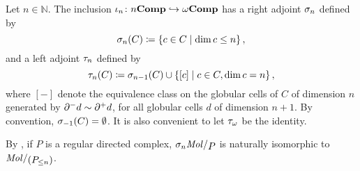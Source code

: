 \begin{dfn} 
    Let \( n \in \mathbb{N} \).
    The inclusion \( \iota_n \colon {n\mathbf{Comp}} \hookrightarrow \omega\mathbf{Comp} \) has a right adjoint \( \sigma_{n} \) defined by
    \begin{equation*}
        \sigma_{n}(C) \coloneqq \left\{ {c \in C \mid \dim c \le n} \right\},
    \end{equation*}
    and a left adjoint \( \tau_{n} \) defined by
    \begin{equation*}
        \tau_{n}(C) \coloneqq \sigma_{n - 1}(C) \cup \left\{ {[c] \mid c \in C, \dim c = n} \right\},
    \end{equation*}
    where \( [-] \) denote the equivalence class on the globular cells of \( C \) of dimension \( n \) generated by \( \partial_{}^{-} d \sim \partial_{}^{+} d \), for all globular cells \( d \) of dimension \( n + 1 \). 
    By convention, \( \sigma_{-1}(C) = \emptyset \).
    It is also convenient to let \( \tau_{\omega} \) be the identity.
\end{dfn}

\begin{rmk}
    By \cite[Proposition 5.2.14]{hadzihasanovic2024combinatorics}, if \( P \) is a regular directed complex, \( \skel{n} \molecin{P} \) is naturally isomorphic to \( \molecin{(\gr{\le n}P)} \).
\end{rmk}

